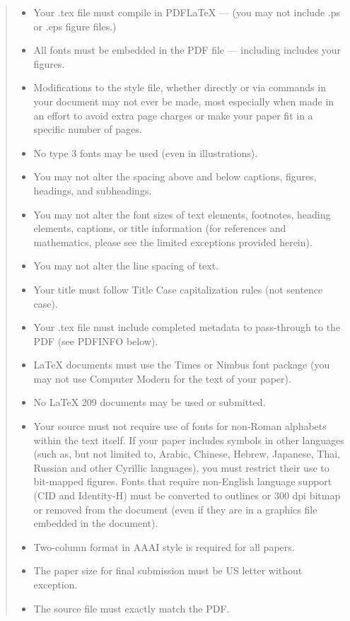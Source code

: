 \documentclass[letterpaper]{article} \usepackage{aaai21}  \usepackage{times}  \usepackage{helvet} \usepackage{courier}  \usepackage[hyphens]{url}  \usepackage{graphicx} \urlstyle{rm} \def\UrlFont{\rm}  \usepackage{natbib}  \usepackage{caption} \frenchspacing  \setlength{\pdfpagewidth}{8.5in}  \setlength{\pdfpageheight}{11in}  \usepackage{cite}
\begin{document}
\begin{quote}
\begin{itemize}
\item Your .tex file must compile in PDF\LaTeX{} --- (you may not include .ps or .eps figure files.)
\item All fonts must be embedded in the PDF file --- including includes your figures.
\item Modifications to the style file, whether directly or via commands in your document may not ever be made, most especially when made in an effort to avoid extra page charges or make your paper fit in a specific number of pages.
\item No type 3 fonts may be used (even in illustrations).
\item You may not alter the spacing above and below captions, figures, headings, and subheadings.
\item You may not alter the font sizes of text elements, footnotes, heading elements, captions, or title information (for references and mathematics, please see the limited exceptions provided herein).
\item You may not alter the line spacing of text.
\item Your title must follow Title Case capitalization rules (not sentence case).
\item Your .tex file must include completed metadata to pass-through to the PDF (see PDFINFO below).
\item \LaTeX{} documents must use the Times or Nimbus font package (you may not use Computer Modern for the text of your paper).
\item No \LaTeX{} 209 documents may be used or submitted.
\item Your source must not require use of fonts for non-Roman alphabets within the text itself. If your paper includes symbols in other languages (such as, but not limited to, Arabic, Chinese, Hebrew, Japanese, Thai, Russian and other Cyrillic languages), you must restrict their use to bit-mapped figures. Fonts that require non-English language support (CID and Identity-H) must be converted to outlines or 300 dpi bitmap or removed from the document (even if they are in a graphics file embedded in the document).
\item Two-column format in AAAI style is required for all papers.
\item The paper size for final submission must be US letter without exception.
\item The source file must exactly match the PDF.

\end{itemize}
\end{quote}
\end{document}
